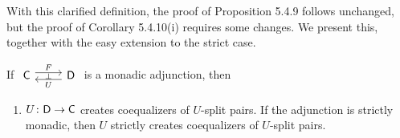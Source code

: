 \documentclass[../../solutions]{subfiles}
\begin{document}
With this clarified definition, the proof of Proposition 5.4.9 follows
unchanged, but the proof of Corollary 5.4.10(i) requires some changes.
We present this, together with the easy extension to the strict case.

\begin{corollary}
  \label{corr:5.4.10}%
  If $\begin{tikzcd}\sC
    \ar[r, shift left=0.7ex, "F"]
    \ar[r, shift right=0.7ex, leftarrow, "U"']
    \ar[r, phantom, "\scriptstyle\bot"]
    & \sD
  \end{tikzcd}$ is a monadic adjunction, then
  \begin{enumerate}[label=(\roman*)]
  \item ${U}\colon{{\mathsf{D}}}\to{{\mathsf{C}}}$ creates coequalizers of $U$-split pairs.
    If the adjunction is strictly monadic, then $U$ strictly creates
    coequalizers of $U$-split pairs.
  \end{enumerate}
\end{corollary}
\popthm
\end{document}
